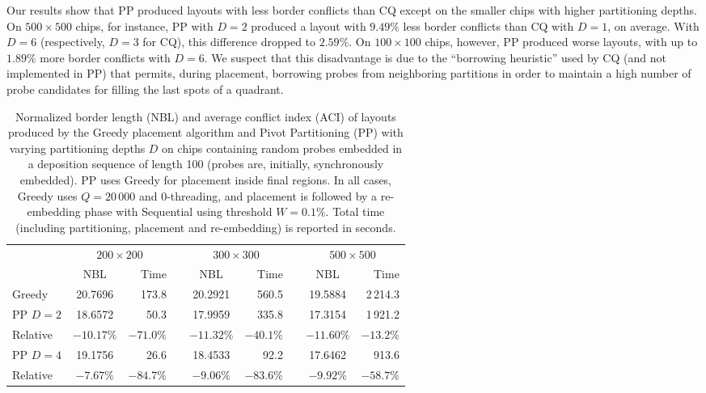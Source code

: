 Our results show that PP produced layouts with less border conflicts than CQ
except on the smaller chips with higher partitioning depths. On $500\times 500$
chips, for instance, PP with $D=2$ produced a layout with $9.49\%$ less border
conflicts than CQ with $D=1$, on average. With $D=6$ (respectively, $D=3$ for
CQ), this difference dropped to $2.59\%$. On $100\times 100$ chips, however, PP
produced worse layouts, with up to $1.89\%$ more border conflicts with $D=6$.
We suspect that this disadvantage is due to the ``borrowing heuristic'' used by
CQ (and not implemented in PP) that permits, during placement, borrowing probes
from neighboring partitions in order to maintain a high number of probe
candidates for filling the last spots of a quadrant.

\begin{table}[t!]\centering
\caption{\label{tab:pp_sync}
  Normalized border length (NBL) and average conflict index (ACI) of layouts
  produced by the Greedy placement algorithm and Pivot Partitioning (PP) with
  varying partitioning depths $D$ on chips containing random probes embedded in
  a deposition sequence of length 100 (probes are, initially, synchronously
  embedded). PP uses Greedy for placement inside final regions. In all cases,
  Greedy uses $Q=20\,000$ and $0$-threading, and placement is followed by a
  re-embedding phase with Sequential using threshold $W=0.1\%$. Total time
  (including partitioning, placement and re-embedding) is reported in seconds.}
\footnotesize{
\begin{tabular}{lcrlcrlcr}
\vspace{1pt}
 & \multicolumn{2}{c}{$200\times 200$} & & \multicolumn{2}{c}{$300\times 300$} & & \multicolumn{2}{c}{$500\times 500$} \\
\cline{2-3} \cline{5-6} \cline{8-9}
\vspace{1pt}
         & NBL      & Time    & & NBL      & Time    & & NBL      & Time       \\
\hline
Greedy   &  20.7696 & 173.8   & &  20.2921 & 560.5   & &  19.5884 & 2\,214.3   \\
\hline
PP $D=2$ &  18.6572 &  50.3   & &  17.9959 & 335.8   & &  17.3154 & 1\,921.2   \\
Relative &$-10.17\%$&$-71.0\%$& &$-11.32\%$&$-40.1\%$& &$-11.60\%$&   $-13.2\%$\\
\hline
PP $D=4$ &  19.1756 &  26.6   & &  18.4533 &  92.2   & &  17.6462 &    913.6   \\
Relative & $-7.67\%$&$-84.7\%$& & $-9.06\%$&$-83.6\%$& & $-9.92\%$&   $-58.7\%$\\

\end{tabular}}
\end{table}
